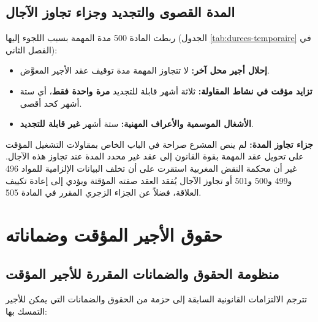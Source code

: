 \subsection{المدة القصوى والتجديد وجزاء تجاوز الآجال}
ربطت المادة \textenglish{500} مدة المهمة بسبب اللجوء إليها (الجدول \ref{tab:durees-temporaire} في الفصل الثاني):
\begin{itemize}[leftmargin=*, itemsep=4pt]
    \item \textbf{إحلال أجير محل آخر:} لا تتجاوز المهمة مدة توقيف عقد الأجير المعوَّض.
    \item \textbf{تزايد مؤقت في نشاط المقاولة:} ثلاثة أشهر قابلة للتجديد \textbf{مرة واحدة فقط}، أي ستة أشهر كحد أقصى.
    \item \textbf{الأشغال الموسمية والأعراف المهنية:} ستة أشهر \textbf{غير قابلة للتجديد}.
\end{itemize}

\textbf{جزاء تجاوز المدة:} لم ينص المشرع صراحة في الباب الخاص بمقاولات التشغيل المؤقت على تحويل عقد المهمة بقوة القانون إلى عقد غير محدد المدة عند تجاوز هذه الآجال. غير أن محكمة النقض المغربية استقرت على أن تخلف البيانات الإلزامية للمواد \textenglish{496} و\textenglish{499} و\textenglish{500} و\textenglish{501} أو تجاوز الآجال يُفقد العقد صفته المؤقتة ويؤدي إلى إعادة تكييف العلاقة، فضلاً عن الجزاء الزجري المقرر في المادة \textenglish{505}.

\section{حقوق الأجير المؤقت وضماناته}

\subsection{منظومة الحقوق والضمانات المقررة للأجير المؤقت}
تترجم الالتزامات القانونية السابقة إلى حزمة من الحقوق والضمانات التي يمكن للأجير التمسك بها:

